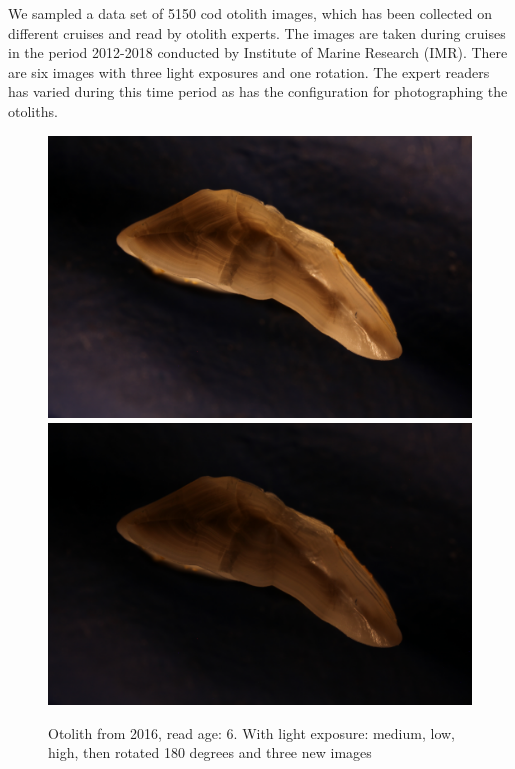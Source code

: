 \documentclass[10pt,letterpaper]{article}
\begin{document}
We sampled a data set of  5150 cod otolith images, which has been collected 
on different cruises and read by otolith experts. The images are taken during
cruises in the period 2012-2018 conducted by Institute of Marine Research (IMR).
There are six images with three light exposures and one rotation.
The expert readers has varied during this time period as has the configuration
for photographing the otoliths. 

\begin{figure}[h!]
  \caption{Otolith from 2016, read age: 6. With light exposure: medium, low, high, 
  then rotated 180 degrees and three new images}
  \centering
  \includegraphics[scale=0.015]{otolith/IMG_0457_2016_70021.JPG}
  \includegraphics[scale=0.015]{otolith/IMG_0458_2016_70021.JPG}

\end{figure}
\end{document}
